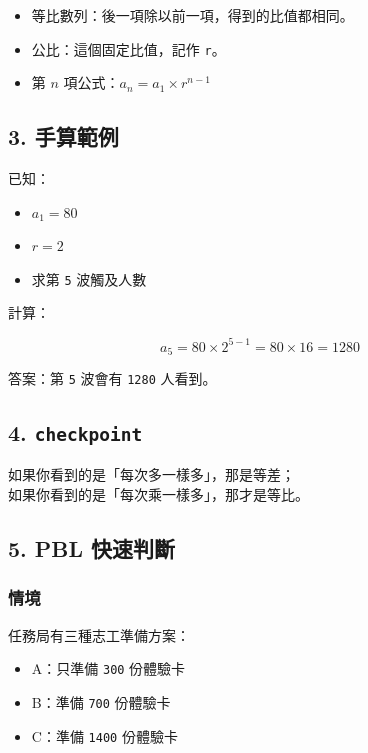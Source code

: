 \documentclass[
  chinese,
  12pt,
  a4paper,
  oneside]{article}
\providecommand{\tightlist}{%
  \setlength{\itemsep}{0pt}\setlength{\parskip}{0pt}}
\begin{document}
\begin{itemize}
\tightlist
\item
  等比數列：後一項除以前一項，得到的比值都相同。
\item
  公比：這個固定比值，記作 \texttt{r}。
\item
  第 \(n\) 項公式：\(a_n = a_1 \times r^{n - 1}\)
\end{itemize}

\subsection{3. 手算範例}\label{ux624bux7b97ux7bc4ux4f8b-1}

已知：

\begin{itemize}
\tightlist
\item
  \(a_1 = 80\)
\item
  \(r = 2\)
\item
  求第 \texttt{5} 波觸及人數
\end{itemize}

計算：

\[
a_5 = 80 \times 2^{5 - 1} = 80 \times 16 = 1280
\]

答案：第 \texttt{5} 波會有 \texttt{1280} 人看到。

\subsection{\texorpdfstring{4.
\texttt{checkpoint}}{4. checkpoint}}\label{checkpoint-1}

如果你看到的是「每次多一樣多」，那是等差；\\
如果你看到的是「每次乘一樣多」，那才是等比。

\subsection{5. PBL 快速判斷}\label{pbl-ux5febux901fux5224ux65b7}

\subsubsection{情境}\label{ux60c5ux5883-1}

任務局有三種志工準備方案：

\begin{itemize}
\tightlist
\item
  A：只準備 \texttt{300} 份體驗卡
\item
  B：準備 \texttt{700} 份體驗卡
\item
  C：準備 \texttt{1400} 份體驗卡
\end{itemize}
\end{document}
